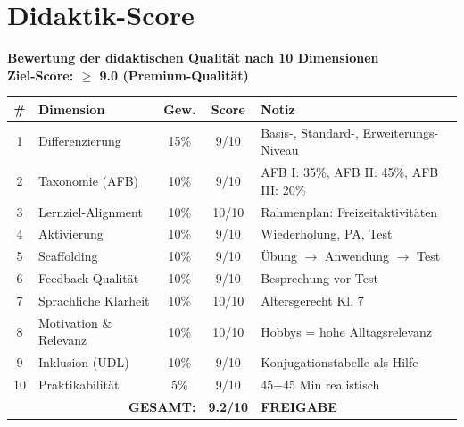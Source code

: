 \documentclass[11pt,a4paper]{article}
\begin{document}
\newpage
\section{Didaktik-Score}

\begin{scorebox}
\textbf{Bewertung der didaktischen Qualität nach 10 Dimensionen}\\
\textbf{Ziel-Score: $\geq$ 9.0 (Premium-Qualität)}

\vspace{1em}
\begin{tabular}{|c|l|c|c|p{4.5cm}|}
\hline
\textbf{\#} & \textbf{Dimension} & \textbf{Gew.} & \textbf{Score} & \textbf{Notiz} \\
\hline
1 & Differenzierung & 15\% & 9/10 & Basis-, Standard-, Erweiterungs-Niveau \\
\hline
2 & Taxonomie (AFB) & 10\% & 9/10 & AFB I: 35\%, AFB II: 45\%, AFB III: 20\% \\
\hline
3 & Lernziel-Alignment & 10\% & 10/10 & Rahmenplan: Freizeitaktivitäten \\
\hline
4 & Aktivierung & 10\% & 9/10 & Wiederholung, PA, Test \\
\hline
5 & Scaffolding & 10\% & 9/10 & Übung $\rightarrow$ Anwendung $\rightarrow$ Test \\
\hline
6 & Feedback-Qualität & 10\% & 9/10 & Besprechung vor Test \\
\hline
7 & Sprachliche Klarheit & 10\% & 10/10 & Altersgerecht Kl. 7 \\
\hline
8 & Motivation \& Relevanz & 10\% & 10/10 & Hobbys = hohe Alltagsrelevanz \\
\hline
9 & Inklusion (UDL) & 10\% & 9/10 & Konjugationstabelle als Hilfe \\
\hline
10 & Praktikabilität & 5\% & 9/10 & 45+45 Min realistisch \\
\hline
\multicolumn{3}{|r|}{\textbf{GESAMT:}} & \textbf{9.2/10} & \textcolor{successgreen}{\textbf{FREIGABE}} \\
\hline
\end{tabular}
\end{scorebox}
\end{document}
